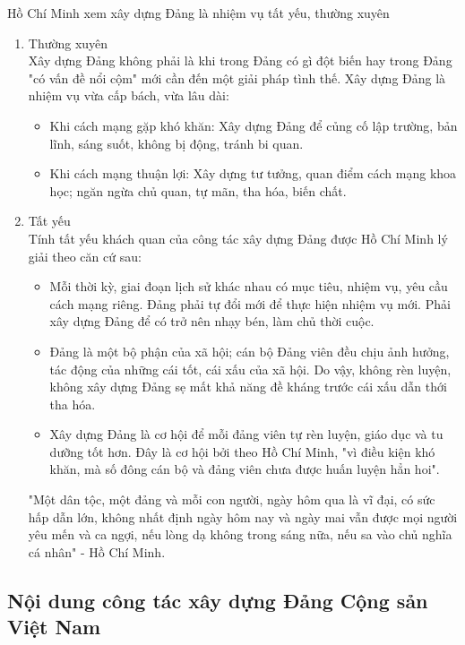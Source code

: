 \documentclass{article}
\begin{document}
	Hồ Chí Minh xem xây dựng Đảng là nhiệm vụ tất yếu, thường xuyên
	\begin{enumerate}
		\item Thường xuyên\\
		Xây dựng Đảng không phải là khi trong Đảng có gì đột biến hay trong Đảng "có vấn đề nổi cộm" mới cần đến một giải pháp tình thế. Xây dựng Đảng là nhiệm vụ vừa cấp bách, vừa lâu dài:
		\begin{itemize}
			\item Khi cách mạng gặp khó khăn: Xây dựng Đảng để củng cố lập trường, bản lĩnh, sáng suốt, không bị động, tránh bi quan.
			\item Khi cách mạng thuận lợi: Xây dựng tư tưởng, quan điểm cách mạng khoa học; ngăn ngừa chủ quan, tự mãn, tha hóa, biến chất.
		\end{itemize}
		\item Tất yếu\\
		Tính tất yếu khách quan của công tác xây dựng Đảng được Hồ Chí Minh lý giải theo căn cứ sau:
		\begin{itemize}
			\item Mỗi thời kỳ, giai đoạn lịch sử khác nhau có mục tiêu, nhiệm vụ, yêu cầu cách mạng riêng. Đảng phải tự đổi mới để thực hiện nhiệm vụ mới. Phải xây dựng Đảng để có trở nên nhạy bén, làm chủ thời cuộc.
			\item Đảng là một bộ phận của xã hội; cán bộ Đảng viên đều chịu ảnh hưởng, tác động của những cái tốt, cái xấu của xã hội. Do vậy, không rèn luyện, không xây dựng Đảng sẹ mất khả năng đề kháng trước cái xấu dẫn thới tha hóa.
			\item Xây dựng Đảng là cơ hội để mỗi đảng viên tự rèn luyện, giáo dục và tu dưỡng tốt hơn. Đây là cơ hội bởi theo Hồ Chí Minh, "vì điều kiện khó khăn, mà số đông cán bộ và đảng viên chưa được huấn luyện hẳn hoi".
		\end{itemize}
		"Một dân tộc, một đảng và mỗi con người, ngày hôm qua là vĩ đại, có sức hấp dẫn lớn, không nhất định ngày hôm nay và ngày mai vẫn được mọi người yêu mến và ca ngợi, nếu lòng dạ không trong sáng nữa, nếu sa vào chủ nghĩa cá nhân" - Hồ Chí Minh.
	\end{enumerate}
	\subsection{Nội dung công tác xây dựng Đảng Cộng sản Việt Nam}
\end{document}
